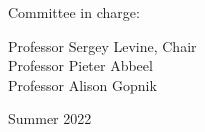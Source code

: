 \begin{titlepage}
\vfill



\hfill\begin{minipage}{\textwidth} %
\begin{center}
Committee in charge: \\
\begin{spacing}{2.0}
\end{spacing}
Professor Sergey Levine, Chair \\
Professor Pieter Abbeel \\
Professor Alison Gopnik \\
\end{center}

\vfill
\begin{center}
Summer 2022   
\end{center}
\end{minipage}






\end{titlepage}   
